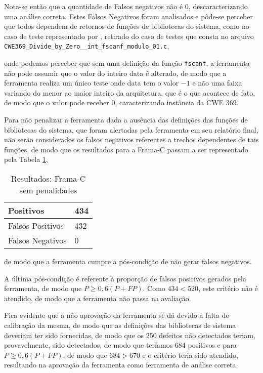 Nota-se então que a quantidade de Falsos negativos não é 0, descaracterizando uma análise correta. Estes Falsos Negativos foram analisados e pôde-se perceber que todos dependem de retornos de funções de bibliotecas do sistema, como no caso de teste representado por , retirado do caso de testes que consta no arquivo \lstinline{CWE369_Divide_by_Zero__int_fscanf_modulo_01.c},
      
      onde podemos perceber que sem uma definição da função \lstinline{fscanf}, a ferramenta não pode assumir que o valor do inteiro data é alterado, de modo que a ferramenta realiza um único teste onde data tem o valor $-1$ e não uma faixa variando do menor ao maior inteiro da arquitetura, que é o que acontece de fato, de modo que o valor pode receber 0, caracterizando instância da CWE 369. 

      Para não penalizar a ferramenta dada a ausência das definições das funções de bibliotecas do sistema, que foram alertadas pela ferramenta em seu relatório final, não serão considerados os falsos negativos referentes a trechos dependentes de tais funções, de modo que os resultados para a Frama-C passam a ser representado pela Tabela \ref{tabela_framac2},
\begin{table}[h]
\caption{Resultados: Frama-C sem penalidades}
  \centering
\begin{tabular}{l | l}
  \hline
  Positivos\index{positivo} & 434 \\ \hline
  Falsos Positivos\index{falso positivo} & 432 \\ \hline
  Falsos Negativos\index{falso negativo} & 0 \\
  \hline
\end{tabular}
\label{tabela_framac2}
\end{table}
      de modo que a ferramenta cumpre a pós-condição de não gerar falsos negativos.

      A última pós-condição é referente à proporção de falsos positivos gerados pela ferramenta, de modo que
      $P \geq 0,6(P + FP)$.
      Como 
      $434 < 520$,
      este critério não é atendido, de modo que a ferramenta não passa na avaliação.

      Fica evidente que a não aprovação da ferramenta se dá devido à falta de calibração da mesma, de modo que as definições das bibliotecas de sistema deveriam ter sido fornecidas, de modo que os 250 defeitos não detectados teriam, provavelmente, sido detectados, de modo que teríamos 684 positivos e para
      $P \geq 0,6(P + FP)$,
      de modo que
      $684 > 670$
      e o critério teria sido atendido, resultando na aprovação da ferramenta como ferramenta de análise correta.
